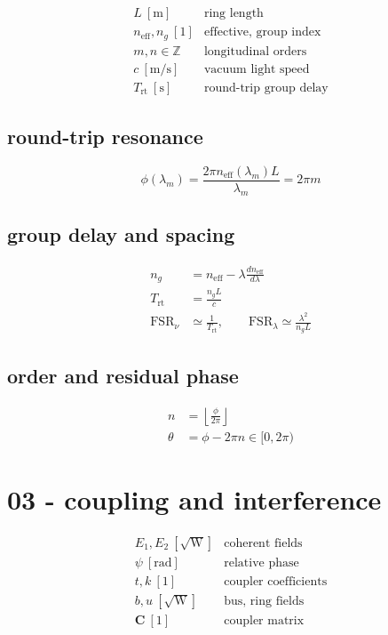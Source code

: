 \[
\begin{array}{ll}L\ [\mathrm m]&\text{ring length}\\[0.6em]n_{\mathrm{eff}},n_g\ [1]&\text{effective, group index}\\[0.6em]m,n\in\mathbb Z&\text{longitudinal orders}\\[0.6em]c\ [\mathrm{m/s}]&\text{vacuum light speed}\\[0.6em]T_{\mathrm{rt}}\ [\mathrm s]&\text{round-trip group delay}\end{array}
\]

\subsection*{round-trip resonance}
\[
\displaystyle \phi(\lambda_m)=\frac{2\pi n_{\mathrm{eff}}(\lambda_m)L}{\lambda_m}=2\pi m
\]

\subsection*{group delay and spacing}
\[
\displaystyle \begin{aligned}n_g&=n_{\mathrm{eff}}-\lambda\frac{dn_{\mathrm{eff}}}{d\lambda}\\T_{\mathrm{rt}}&=\frac{n_gL}{c}\\\mathrm{FSR}_{\nu}&\simeq\frac1{T_{\mathrm{rt}}},\qquad\mathrm{FSR}_{\lambda}\simeq\frac{\lambda^2}{n_gL}\end{aligned}
\]

\subsection*{order and residual phase}
\[
\displaystyle \begin{aligned}n&=\left\lfloor\frac{\phi}{2\pi}\right\rfloor\\\theta&=\phi-2\pi n\in[0,2\pi)\end{aligned}
\]

\clearpage
\section*{03 - coupling and interference}

\[
\begin{array}{ll}E_1,E_2\ [\sqrt{\mathrm W}]&\text{coherent fields}\\[0.6em]\psi\ [\mathrm{rad}]&\text{relative phase}\\[0.6em]t,k\ [1]&\text{coupler coefficients}\\[0.6em]b,u\ [\sqrt{\mathrm W}]&\text{bus, ring fields}\\[0.6em]\mathbf C\ [1]&\text{coupler matrix}\end{array}
\]


